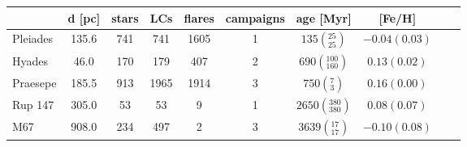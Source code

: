 \begin{tabular}{lccccccccr}
\hline
          &  d [pc] &  stars &   LCs &  flares &  campaigns &                        age [Myr] &         [Fe/H] \\
\hline
 Pleiades &   135.6 &    741 &   741 &    1605 &          1 &     $135\left(_{25}^{25}\right)$ &  $-0.04(0.03)$ \\
   Hyades &    46.0 &    170 &   179 &     407 &          2 &   $690\left(_{160}^{100}\right)$ &   $0.13(0.02)$ \\
 Praesepe &   185.5 &    913 &  1965 &    1914 &          3 &       $750\left(_{3}^{7}\right)$ &   $0.16(0.00)$ \\
  Rup 147 &   305.0 &     53 &    53 &       9 &          1 &  $2650\left(_{380}^{380}\right)$ &   $0.08(0.07)$ \\
      M67 &   908.0 &    234 &   497 &       2 &          3 &    $3639\left(_{17}^{17}\right)$ &  $-0.10(0.08)$ \\
\hline

\end{tabular}
